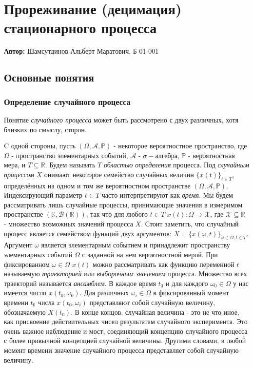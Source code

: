 

\section{Прореживание (децимация) стационарного процесса}

\textbf{Автор:} Шамсутдинов Альберт Маратович, Б-01-001	

\subsection{Основные понятия}
\subsubsection{Определение случайного процесса}
\label{sec:def}
Понятие \textsl{случайного процесса} может быть рассмотрено с двух различных, хотя близких по смыслу, сторон.

C одной стороны, пусть $(\Omega, \mathscr{A}, \mathbb{P})$ - некоторое вероятностное пространство, где $\Omega$ - пространство элементарных событий, $\mathscr{A}$ - $\sigma-$алгебра, $\mathbb{P}$ - вероятностная мера, и $T \subseteq  \mathbb{R}$. Будем называть $T$ \textsl{областью определения} процесса. Под \textsl{случайным процессом} $X$ онимают некоторое семейство случайных величин $\{x(t)\}_{t \in T}$, определённых на одном
и том же вероятностном пространстве $(\Omega, \mathscr{A}, \mathbb{P})$. Индексирующий параметр $t \in T$ часто интерпретируют как \textsl{время}. Мы будем рассматривать лишь случайные процессы, принимающие значения в измеримом пространстве $(\mathbb{R}, \mathscr{B}(\mathbb{R}))$, так что  для любого $t \in T$ $x(t):\Omega \to \mathscr{X}$, где $\mathscr{X} \subseteq \mathbb{R}$ - множество возможных значений процесса $X$. Стоит заметить, что случайный процесс является семейством функций двух аргументов: $X = \{x(\omega, t)\}_{\omega \in \Omega, t \in T}$. Аргумент $\omega$ является элементарным событием и принадлежит пространству элементарных событий $\Omega$ с заданной на нем вероятностной мерой. При фиксированном $\omega \in \Omega$ $x(t)$ можно
рассматривать как функцию переменной $t$ называемую \textsl{траекторией} или \textsl{выборочным значением} процесса. Множество всех траекторий называется \textsl{ансамблем}. В каждое время $t_{0}$ и для каждого $\omega_{0} \in \Omega$ у нас имеется число $x(t_{0}, \omega_{0})$. Для
различных $\omega_{i} \in \Omega$ в фиксированный момент времени $t_{0}$ числа $x(t_{0}, \omega_{i})$ представляют собой случайную величину, обозначаемую $X(t_0)$. В конце концов, случайная величина - это не что иное, как присвоение действительных чисел результатам случайного эксперимента. Это очень важное наблюдение и мост, соединяющий концепцию случайного процесса с более привычной концепцией случайной величины. Другими словами, в любой момент времени значение случайного процесса представляет собой случайную величину.


